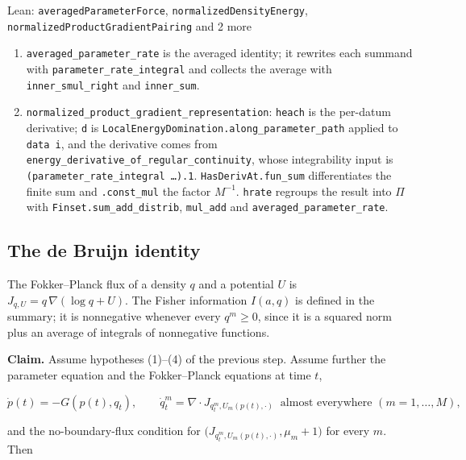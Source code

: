 \documentclass[11pt,a4paper]{report}
\begin{document}
\begin{leanbox}{Lean: \texttt{averagedParameterForce}, \texttt{normalizedDensityEnergy}, \texttt{normalizedProductGradientPairing} and 2 more}
\begin{enumerate}
\item \texttt{averaged\_\allowbreak{}parameter\_\allowbreak{}rate} is the averaged identity; it rewrites each summand with \texttt{parameter\_\allowbreak{}rate\_\allowbreak{}integral} and collects the average with \texttt{inner\_\allowbreak{}smul\_\allowbreak{}right} and \texttt{inner\_\allowbreak{}sum}.

\item \texttt{normalized\_\allowbreak{}product\_\allowbreak{}gradient\_\allowbreak{}representation}: \texttt{heach} is the per-datum derivative; \texttt{d} is \texttt{Local\allowbreak{}Energy\allowbreak{}Domination.\allowbreak{}along\_\allowbreak{}parameter\_\allowbreak{}path} applied to \texttt{data i}, and the derivative comes from \texttt{energy\_\allowbreak{}derivative\_\allowbreak{}of\_\allowbreak{}regular\_\allowbreak{}continuity}, whose integrability input is \texttt{(parameter\_\allowbreak{}rate\_\allowbreak{}integral …).\allowbreak{}1}. \texttt{Has\allowbreak{}Deriv\allowbreak{}At.\allowbreak{}fun\_\allowbreak{}sum} differentiates the finite sum and \texttt{.\allowbreak{}const\_\allowbreak{}mul} the factor \(M^{-1}\). \texttt{hrate} regroups the result into \(\Pi\) with \texttt{Finset.\allowbreak{}sum\_\allowbreak{}add\_\allowbreak{}distrib}, \texttt{mul\_\allowbreak{}add} and \texttt{averaged\_\allowbreak{}parameter\_\allowbreak{}rate}.

\end{enumerate}
\end{leanbox}
\subsection{\texorpdfstring{The de Bruijn identity}{The de Bruijn identity}}


The Fokker–Planck flux of a density \(q\) and a potential \(U\) is \(J_{q,U}=q\,\nabla(\log q+U)\). The Fisher information \(I(a,q)\) is defined in the summary; it is nonnegative whenever every \(q^m\ge0\), since it is a squared norm plus an average of integrals of nonnegative functions.




\textbf{Claim.} Assume hypotheses (1)–(4) of the previous step. Assume further the parameter equation and the Fokker–Planck equations at time \(t\),


\[\dot p(t)=-G(p(t),q_t),\qquad\dot q^m_t=\nabla\cdot J_{q^m_t,U_m(p(t),\cdot)}\ \text{ almost everywhere }(m=1,\dots,M),\]


and the no-boundary-flux condition for \(\bigl(J_{q^m_t,U_m(p(t),\cdot)},\mu_m+1\bigr)\) for every \(m\). Then
\end{document}
